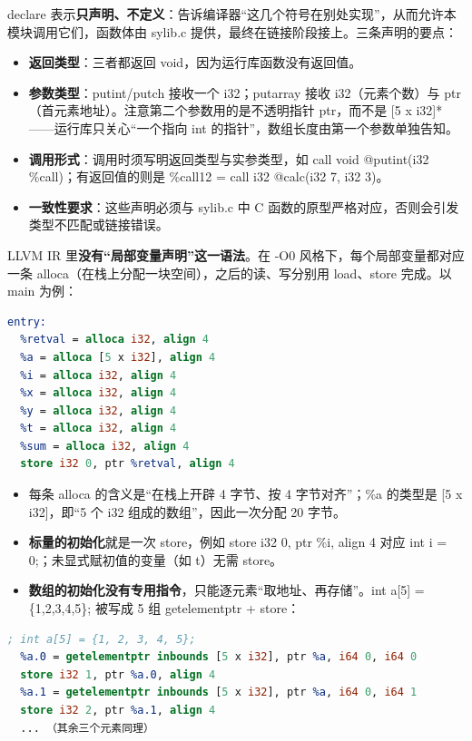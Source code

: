 \documentclass[UTF8,a4paper,10pt]{ctexart}
\newcommand{\hfour}[1]{\par\vspace{0.55em}\noindent{\bfseries #1}\par\vspace{0.25em}}
\begin{document}
declare 表示\textbf{只声明、不定义}：告诉编译器“这几个符号在别处实现”，从而允许本模块调用它们，函数体由 sylib.c 提供，最终在链接阶段接上。三条声明的要点：

\begin{itemize}
  \item \textbf{返回类型}：三者都返回 void，因为运行库函数没有返回值。
  \item \textbf{参数类型}：putint/putch 接收一个 i32；putarray 接收 i32（元素个数）与 ptr（首元素地址）。注意第二个参数用的是不透明指针 ptr，而不是 [5 x i32]*——运行库只关心“一个指向 int 的指针”，数组长度由第一个参数单独告知。
  \item \textbf{调用形式}：调用时须写明返回类型与实参类型，如 call void @putint(i32 \%call)；有返回值的则是 \%call12 = call i32 @calc(i32 7, i32 3)。
  \item \textbf{一致性要求}：这些声明必须与 sylib.c 中 C 函数的原型严格对应，否则会引发类型不匹配或链接错误。
\end{itemize}

\hfour{4、变量的表示与初始化}

LLVM IR 里\textbf{没有“局部变量声明”这一语法}。在 -O0 风格下，每个局部变量都对应一条 alloca（在栈上分配一块空间），之后的读、写分别用 load、store 完成。以 main 为例：

\begin{lstlisting}[language=LLVM]
entry:
  %retval = alloca i32, align 4
  %a = alloca [5 x i32], align 4
  %i = alloca i32, align 4
  %x = alloca i32, align 4
  %y = alloca i32, align 4
  %t = alloca i32, align 4
  %sum = alloca i32, align 4
  store i32 0, ptr %retval, align 4
\end{lstlisting}

\begin{itemize}
  \item 每条 alloca 的含义是“在栈上开辟 4 字节、按 4 字节对齐”；\%a 的类型是 [5 x i32]，即“5 个 i32 组成的数组”，因此一次分配 20 字节。
  \item \textbf{标量的初始化}就是一次 store，例如 store i32 0, ptr \%i, align 4 对应 int i = 0;；未显式赋初值的变量（如 t）无需 store。
  \item \textbf{数组的初始化没有专用指令}，只能逐元素“取地址、再存储”。int a[5] = \{1,2,3,4,5\}; 被写成 5 组 getelementptr + store：
\end{itemize}

\begin{lstlisting}[language=LLVM]
  ; int a[5] = {1, 2, 3, 4, 5};
  %a.0 = getelementptr inbounds [5 x i32], ptr %a, i64 0, i64 0
  store i32 1, ptr %a.0, align 4
  %a.1 = getelementptr inbounds [5 x i32], ptr %a, i64 0, i64 1
  store i32 2, ptr %a.1, align 4
  ... （其余三个元素同理）
\end{lstlisting}
\end{document}
